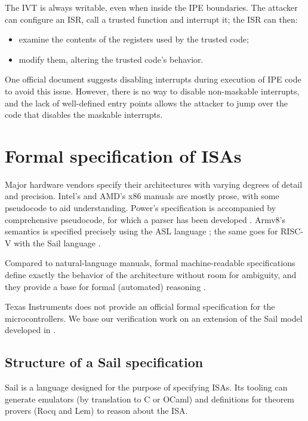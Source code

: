 The IVT is always writable, even when inside the IPE boundaries. The attacker can configure an ISR, call a trusted function and interrupt it; the ISR can then:
\begin{itemize}
\item examine the contents of the registers used by the trusted code;
\item modify them, altering the trusted code's behavior.
\end{itemize}

One official document \cite{slaa685} suggests disabling interrupts during execution of IPE code to avoid this issue. However, there is no way to disable non-maskable interrupts, and the lack of well-defined entry points allows the attacker to jump over the code that disables the maskable interrupts.

\section{Formal specification of ISAs}
\label{sec:formal-isa}

Major hardware vendors specify their architectures with varying degrees of detail and precision. Intel's \cite{Intel2025} and AMD's \cite{AMD2024} x86 manuals are mostly prose, with some pseudocode to aid understanding. Power's specification \cite{OPF2024} is accompanied by comprehensive pseudocode, for which a parser has been developed \cite{libreSOC}. Armv8's semantics is specified precisely using the ASL language \cite{Arm2020}\cite{Reid2016}; the same goes for RISC-V with the Sail language \cite{RVSail}.

Compared to natural-language manuals, formal machine-readable specifications define exactly the behavior of the architecture without room for ambiguity, and they provide a base for formal (automated) reasoning \cite{Armstrong2018}.

Texas Instruments does not provide an official formal specification for the \msp microcontrollers. We base our verification work on an extension of the \msp Sail model developed in \cite{mspthesis}.

\subsection{Structure of a Sail specification}
\label{sec:sail-structure}

Sail \cite{Armstrong} is a language designed for the purpose of specifying ISAs. Its tooling can generate emulators (by translation to C or OCaml) and definitions for theorem provers (\eg Rocq and Lem) to reason about the ISA.

